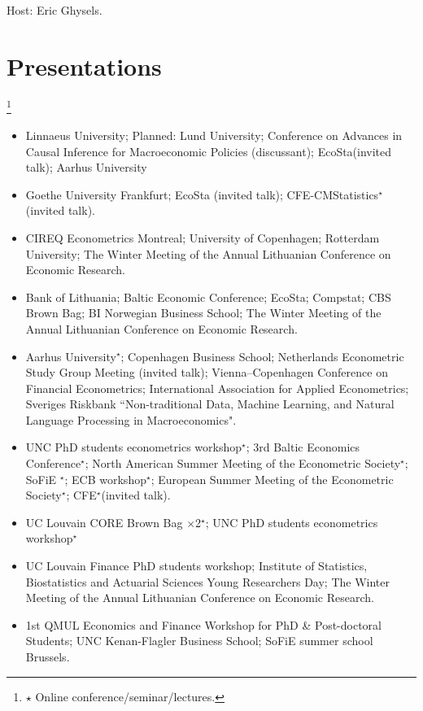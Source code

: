 \documentclass[10pt]{article}
\newcommand\blfootnote[1]{%
	\begingroup
	\renewcommand\thefootnote{}\footnote{#1}%
	\addtocounter{footnote}{-1}%
	\endgroup
}
\newcommand{\thestar}{{\Large{\color{blue}\ensuremath{\star}} }}
\newcommand{\thestarnogap}{{\Large{\color{blue}\ensuremath{^\star}}}}
\begin{document}
	\hspace{2em} Host: Eric Ghysels.


	\section*{Presentations}
	\vspace{-2.5em}
	
	\blfootnote{\thestar Online conference/seminar/lectures.} 
	\begin{itemize}[leftmargin=4.5em]
		\setlength\itemsep{-0.1em}
		\item[2026:] Linnaeus University; Planned: Lund University; Conference on Advances in Causal Inference for Macroeconomic Policies (discussant); EcoSta(invited talk); Aarhus University
		\item[2025:] Goethe University Frankfurt; EcoSta (invited talk); CFE-CMStatistics\thestarnogap (invited talk).
		\item[2024:] CIREQ Econometrics Montreal; University of Copenhagen; Rotterdam University; The Winter Meeting of the Annual Lithuanian Conference on Economic Research.
		\item[2023:] Bank of Lithuania; Baltic Economic Conference; EcoSta; Compstat; CBS Brown Bag; BI Norwegian Business School; The Winter Meeting of the Annual Lithuanian Conference on Economic Research.
		\item[2022:] Aarhus University\thestarnogap; Copenhagen Business School; Netherlands Econometric Study Group Meeting (invited talk); Vienna–Copenhagen Conference on Financial Econometrics; International Association for Applied Econometrics; Sveriges Riskbank ``Non-traditional Data, Machine Learning, and Natural Language Processing in Macroeconomics".
		\item[2021:] UNC PhD students econometrics workshop\thestarnogap; 3rd Baltic Economics Conference\thestarnogap; North American Summer Meeting of the Econometric Society\thestarnogap; SoFiE \thestarnogap; ECB workshop\thestarnogap; European Summer Meeting of the Econometric Society\thestarnogap; CFE\thestarnogap (invited talk).
		\item[2020:] UC Louvain CORE Brown Bag $\times$2\thestarnogap; UNC PhD students econometrics workshop\thestarnogap
		\item[2019:] UC Louvain Finance PhD students workshop; Institute of Statistics, Biostatistics and Actuarial Sciences Young Researchers Day; The Winter Meeting of the Annual Lithuanian Conference on Economic Research.
		\item[2018:] 1st QMUL Economics and Finance Workshop for PhD \& Post-doctoral Students; UNC Kenan-Flagler Business School; SoFiE summer school Brussels.
	\end{itemize}
\end{document}
